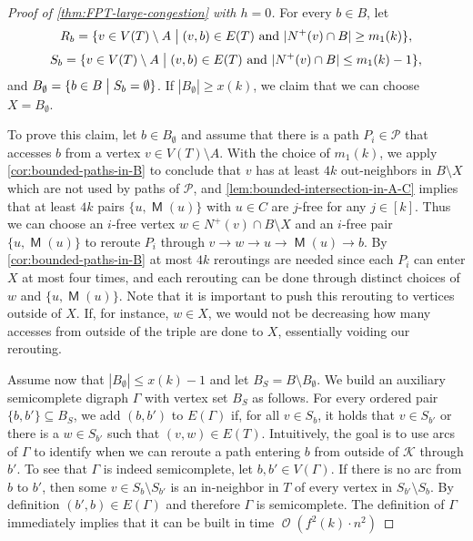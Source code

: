 \documentclass[a4paper,UKenglish,cleveref, autoref, thm-restate]{lipics-v2021}
\DeclareMathOperator{\Ocal}{\mathcal{O}\xspace}
\DeclareMathOperator{\Mat}{\mathsf M}
\renewcommand{\mid}{\bigm|}
\begin{document}
\begin{proof}[Proof of \autoref{thm:FPT-large-congestion} with $h = 0$]
For every $b \in B$, let
\[R_b = \{v \in V(T) \setminus A \mid (v,b) \in E(T) \text{ and } |N^+(v) \cap B| \geq m_1(k)\},\]
\[S_b = \{v \in V(T) \setminus A \mid (v,b) \in E(T) \text{ and } |N^+(v) \cap B| \leq m_1(k) - 1\},\] 
and $B_\emptyset = \{b \in B \mid S_b = \emptyset\}$.
If $|B_\emptyset| \geq x(k)$, we claim that we can choose $X = B_\emptyset$.

To prove this claim, let $b \in B_\emptyset$ and assume that there is a path $P_i \in \mathcal{P}$ that accesses $b$ from a vertex $v \in V(T) \setminus A$.
With the choice of $m_1(k)$, we apply \autoref{cor:bounded-paths-in-B} to conclude that $v$ has at least $4k$ out-neighbors in $B \setminus X$ which are not used by paths of $\mathcal{P}$, and \autoref{lem:bounded-intersection-in-A-C} implies that at least $4k$ pairs $\{u, \Mat(u)\}$ with $u \in C$ are $j$-free for any $j \in [k]$.
Thus we can choose an $i$-free vertex $w \in N^+(v) \cap B \setminus X$ and an $i$-free pair $\{u, \Mat(u)\}$ to reroute $P_i$ through $v \to w \to u \to \Mat(u) \to b$.
By \autoref{cor:bounded-paths-in-B} at most $4k$ reroutings are needed since each $P_i$ can enter $X$ at most four times, and each rerouting can be done through distinct choices of $w$ and $\{u, \Mat(u)\}$.
Note that it is important to push this rerouting to vertices outside of $X$.
If, for instance, $w \in X$, we would not be decreasing how many accesses from outside of the triple are done to $X$, essentially voiding our rerouting.

Assume now that $|B_\emptyset| \leq x(k)-1$ and let $B_S = B \setminus B_\emptyset$.
We build an auxiliary semicomplete digraph $\Gamma$ with vertex set $B_S$ as follows.
For every ordered pair $\{b,b'\} \subseteq B_S$, we add $(b, b')$ to $E(\Gamma)$ if, for all $v \in S_b$, it holds that $v\in S_{b'}$ or there is a $w \in S_{b'}$ such that $(v,w) \in E(T)$.
Intuitively, the goal is to use arcs of $\Gamma$ to identify when we can reroute a path entering $b$ from outside of $\mathcal{K}$ through $b'$.
To see that $\Gamma$ is indeed semicomplete, let $b,b' \in V(\Gamma)$.
If there is no arc from $b$ to $b'$, then some $v \in S_b \setminus S_{b'}$ is an in-neighbor in $T$ of every vertex in $S_{b'} \setminus S_b$. By definition $(b',b) \in E(\Gamma)$ and therefore $\Gamma$ is semicomplete.
The definition of $\Gamma$ immediately implies that it can be built in time $\Ocal(f^2(k) \cdot n^2)$


\end{proof}
\end{document}
